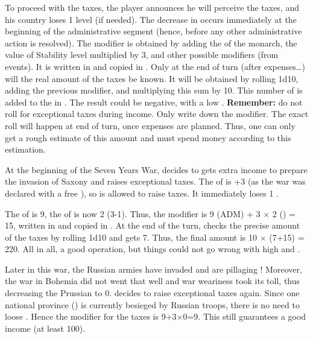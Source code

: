 \aparag To proceed with the taxes, the player announces he will perceive the
taxes, and his country loses 1 \STAB level (if needed). The decrease in \STAB
occurs immediately at the beginning of the administrative segment (hence,
before any other administrative action is resolved).
\bparag The modifier is obtained by adding the \ADM of the monarch, the value
of Stability level multiplied by 3, and other possible modifiers (from
events). It is written in  and
copied in .
\bparag Only at the end of turn (after expenses\ldots) will the real amount of
the taxes be known. It will be obtained by rolling 1d10, adding the previous
modifier, and multiplying this sum by 10. This number of \Ducats is added to
the \RT in .
\bparag The result could be negative, with a low \STAB.
\bparag \textbf{Remember:} do not roll for exceptional taxes during
income. Only write down the modifier. The exact roll will happen at end of
turn, once expenses are planned. Thus, one can only get a rough estimate of
this amount and must spend money according to this estimation.

\begin{exemple}
  At the beginning of the Seven Years War,  decides to
  gets extra income to prepare the invasion of Saxony and raises exceptional
  taxes. The \STAB of \PRU is +3 (as the war was declared with a free \CB), so
  \PRU is allowed to raise taxes. It immediately loses 1 \STAB.

  The \ADM of  is 9, the \STAB of \PRU is now 2
  (3-1). Thus, the modifier is 9 (ADM) + 3 $\times$ 2 (\STAB) = 15, written in
   and copied in
  . At the end of the turn, \PRU
  checks the precise amount of the taxes by rolling 1d10 and gets 7. Thus, the
  final amount is 10 $\times$ (7+15) = 220\ducats. All in all, a good
  operation, but things could not go wrong with high \STAB and \ADM.

  \smallskip

  Later in this war, the Russian armies have invaded \provinceBrandenburg and
  are pillaging \villeBerlin! Moreover, the war in Bohemia did not went that
  well and war weariness took its toll, thus decreasing the Prussian \STAB to
  0.  decides to raise exceptional taxes again. Since
  one national province (\provinceBrandenburg) is currently besieged by
  Russian troops, there is no need to loose \STAB. Hence the modifier for the
  taxes is 9+3$\times$0=9. This still guarantees a good income (at least
  100\ducats).
\end{exemple}


